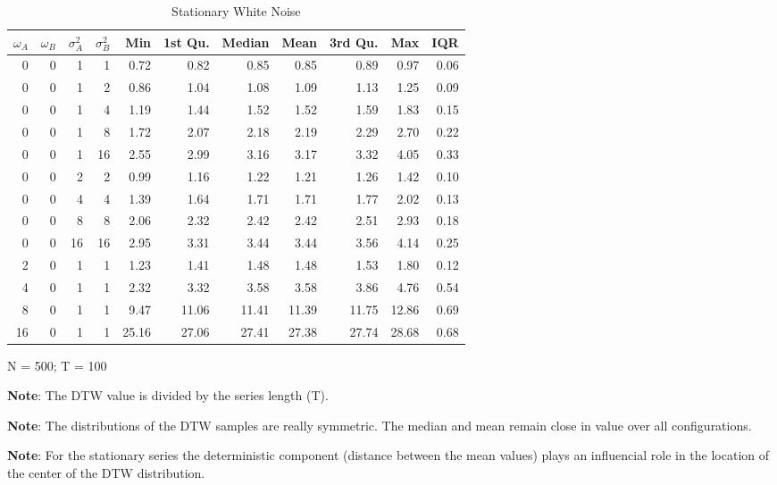 \documentclass[12pt]{article}
\begin{document}
\begin{table}[!htb]
    \begin{center}
      \begin{tabular}{| r r r r | r r r r r r r |}
        \hline
        $\omega_{A}$ & $\omega_{B}$ & $\sigma^{2}_{A}$ & $\sigma^{2}_{B}$ & Min & 1st Qu. & Median & Mean & 3rd Qu. & Max & IQR \\
        \hline
        0  & 0 & 1  & 1  & 0.72  & 0.82  & 0.85  & 0.85  & 0.89  & 0.97  & 0.06 \\
        \hline
        0  & 0 & 1  & 2  & 0.86  & 1.04  & 1.08  & 1.09  & 1.13  & 1.25  & 0.09 \\
        0  & 0 & 1  & 4  & 1.19  & 1.44  & 1.52  & 1.52  & 1.59  & 1.83  & 0.15 \\
        0  & 0 & 1  & 8  & 1.72  & 2.07  & 2.18  & 2.19  & 2.29  & 2.70  & 0.22 \\
        0  & 0 & 1  & 16 & 2.55  & 2.99  & 3.16  & 3.17  & 3.32  & 4.05  & 0.33 \\
        \hline
        0  & 0 & 2  & 2  & 0.99  & 1.16  & 1.22  & 1.21  & 1.26  & 1.42  & 0.10 \\
        0  & 0 & 4  & 4  & 1.39  & 1.64  & 1.71  & 1.71  & 1.77  & 2.02  & 0.13 \\
        0  & 0 & 8  & 8  & 2.06  & 2.32  & 2.42  & 2.42  & 2.51  & 2.93  & 0.18 \\
        0  & 0 & 16 & 16 & 2.95  & 3.31  & 3.44  & 3.44  & 3.56  & 4.14  & 0.25 \\
        \hline
        2  & 0 & 1  & 1  &  1.23 &  1.41 &  1.48 &  1.48 &  1.53 &  1.80 & 0.12 \\
        4  & 0 & 1  & 1  &  2.32 &  3.32 &  3.58 &  3.58 &  3.86 &  4.76 & 0.54 \\
        8  & 0 & 1  & 1  &  9.47 & 11.06 & 11.41 & 11.39 & 11.75 & 12.86 & 0.69 \\
        16 & 0 & 1  & 1  & 25.16 & 27.06 & 27.41 & 27.38 & 27.74 & 28.68 & 0.68 \\
        \hline
      \end{tabular}
    \caption{Stationary White Noise}
    \end{center}
    \begin{tablenotes}
        \item{\footnotesize N = 500; T = 100}
        \item {\footnotesize \textbf{Note}: The DTW value is divided by the series length (T).}
        \item {\footnotesize \textbf{Note}: The distributions of the DTW samples are really symmetric. The median and mean remain close in value over all configurations.}
        \item{\footnotesize \textbf{Note}: For the stationary series the deterministic component (distance between the mean values) plays an influencial role in the location of the center of the DTW distribution.}
    \end{tablenotes}
\end{table}
\end{document}
